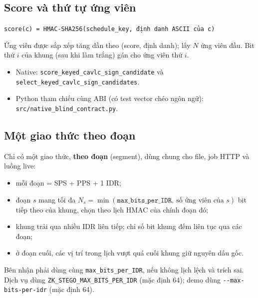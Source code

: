 \documentclass[11pt,a4paper]{article}
\begin{document}
\subsection{Score và thứ tự ứng viên}

\begin{center}
\texttt{score(c) = HMAC-SHA256(schedule\_key, định danh ASCII của c)}
\end{center}

Ứng viên được sắp xếp tăng dần theo (score, định danh); lấy \(N\) ứng viên đầu.
Bit thứ \(i\) của khung (sau khi làm trắng) gán cho ứng viên thứ \(i\).
\begin{itemize}[leftmargin=*]
  \item Native: \texttt{score\_keyed\_cavlc\_sign\_candidate} và
  \texttt{select\_keyed\_cavlc\_sign\_candidates}.
  \item Python tham chiếu cùng ABI (có test vector chéo ngôn ngữ):
  \nolinkurl{src/native_blind_contract.py}.
\end{itemize}

\subsection{Một giao thức theo đoạn}

Chỉ có một giao thức, \textbf{theo đoạn} (segment), dùng chung cho file, job HTTP
và luồng live:

\begin{itemize}[leftmargin=*]
  \item mỗi đoạn = SPS + PPS + 1 IDR;
  \item đoạn \(s\) mang tối đa \(N_s = \min(\texttt{max\_bits\_per\_IDR},\ \text{số ứng viên của } s)\)
  bit tiếp theo của khung, chọn theo lịch HMAC của chính đoạn đó;
  \item khung trải qua nhiều IDR liên tiếp; chỉ số bit khung đếm liên tục qua các đoạn;
  \item ở đoạn cuối, các vị trí trong lịch vượt quá cuối khung giữ nguyên dấu gốc.
\end{itemize}

Bên nhận phải dùng cùng \texttt{max\_bits\_per\_IDR}, nếu không lịch lệch và trích
sai. Dịch vụ dùng \texttt{ZK\_STEGO\_MAX\_BITS\_PER\_IDR} (mặc định 64); demo
dùng \texttt{-{}-max-bits-per-idr} (mặc định 64).
\end{document}
